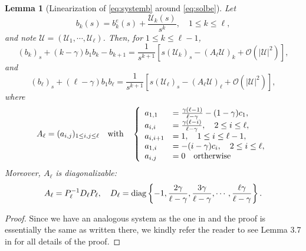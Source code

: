 \documentclass[11pt]{aims}
\newtheorem{lemma}[theorem]{Lemma}
\theoremstyle{definition}
\numberwithin{equation}{section}
\begin{document}
\begin{lemma}[Linearization of \eqref{eq:systemb} around \eqref{eq:solbe}] \label{lemm:lisysb} Let 
\begin{equation}\label{eq:Ukbke}
b_k(s) = b_k^e(s) + \frac{{\mathcal{U}}_k(s)}{s^k}, \quad 1 \leq k \leq \ell,
\end{equation}
and note ${\mathcal{U}} = ({\mathcal{U}}_1, \cdots, {\mathcal{U}}_\ell)$. Then, for $1 \leq k \leq \ell-1$,
\begin{equation}\label{eq:bkk1}
(b_k)_s + (k - \gamma)b_1b_k - b_{k+1} = \frac{1}{s^{k+1}}\left[s({\mathcal{U}}_k)_s - (A_\ell {\mathcal{U}})_k + {\mathcal{O}}(|{\mathcal{U}}|^2)\right], 
\end{equation}
and 
\begin{equation}\label{eq:bell}
(b_\ell)_s + (\ell - \gamma)b_1b_\ell = \frac{1}{s^{k+1}}\left[s({\mathcal{U}}_\ell)_s - (A_\ell {\mathcal{U}})_\ell + {\mathcal{O}}(|{\mathcal{U}}|^2)\right], 
\end{equation}
where 
$$A_\ell = (a_{i,j})_{1\leq i,j\leq \ell} \quad \text{with}\quad \left\{\begin{array}{ll}
a_{1,1} &= \frac{\gamma(\ell - 1)}{\ell - \gamma} - (1 - \gamma)c_1,\\
a_{i,i} &= \frac{\gamma(\ell - i)}{\ell - \gamma}, \quad 2 \leq i \leq \ell,\\
a_{i, i+1}&= 1 , \quad 1 \leq i \leq \ell - 1,\\
a_{1,i} & = -(i - \gamma)c_i, \quad 2 \leq i \leq \ell,\\
a_{i,j} &= 0 \quad \textup{ortherwise}
\end{array} \right.$$
Moreover, $A_\ell$ is diagonalizable: 
\begin{equation}\label{eq:diagAlPl}
A_\ell = P_\ell^{-1}D_\ell P_\ell, \quad D_\ell = \textup{diag}\left\{-1, \frac{2\gamma}{\ell - \gamma}, \frac{3\gamma}{\ell - \gamma}, \cdots, \frac{\ell \gamma}{\ell - \gamma}\right\}.
\end{equation}
\end{lemma}
\begin{proof} Since we have an analogous system as the one in \cite{MRRcjm15} and the proof is essentially the same as written there, we kindly refer the reader to see Lemma 3.7 in \cite{MRRcjm15} for all details of the proof.  
\end{proof}
\end{document}
